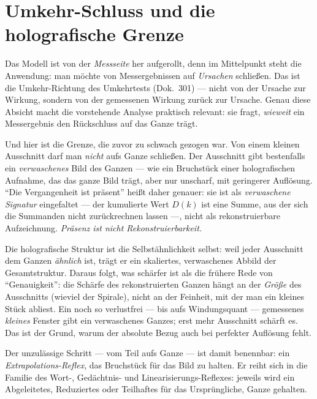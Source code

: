 \section{Umkehr-Schluss und die holografische Grenze}

Das Modell ist von der \emph{Messseite} her aufgerollt, denn im Mittelpunkt steht die
Anwendung: man möchte von Messergebnissen auf \emph{Ursachen} schließen. Das ist die
Umkehr-Richtung des Umkehrtests (Dok.~301) --- nicht von der Ursache zur Wirkung, sondern von
der gemessenen Wirkung zurück zur Ursache. Genau diese Absicht macht die vorstehende Analyse
praktisch relevant: sie fragt, \emph{wieweit} ein Messergebnis den Rückschluss auf das Ganze
trägt.

Und hier ist die Grenze, die zuvor zu schwach gezogen war. Von einem kleinen Ausschnitt darf
man \emph{nicht} aufs Ganze schließen. Der Ausschnitt gibt bestenfalls ein \emph{verwaschenes}
Bild des Ganzen --- wie ein Bruchstück einer holografischen Aufnahme, das das ganze Bild
trägt, aber nur unscharf, mit geringerer Auflösung. \enquote{Die Vergangenheit ist präsent}
heißt daher genauer: sie ist als \emph{verwaschene Signatur} eingefaltet --- der kumulierte
Wert $D(k)$ ist eine Summe, aus der sich die Summanden nicht zurückrechnen lassen ---, nicht
als rekonstruierbare Aufzeichnung. \emph{Präsenz ist nicht Rekonstruierbarkeit.}

Die holografische Struktur ist die Selbstähnlichkeit selbst: weil jeder Ausschnitt dem Ganzen
\emph{ähnlich} ist, trägt er ein skaliertes, verwaschenes Abbild der Gesamtstruktur. Daraus
folgt, was schärfer ist als die frühere Rede von \enquote{Genauigkeit}: die Schärfe des
rekonstruierten Ganzen hängt an der \emph{Größe} des Ausschnitts (wieviel der Spirale), nicht
an der Feinheit, mit der man ein kleines Stück abliest. Ein noch so verlustfrei --- bis aufs
Windungsquant --- gemessenes \emph{kleines} Fenster gibt ein verwaschenes Ganzes; erst mehr
Ausschnitt schärft es. Das ist der Grund, warum der absolute Bezug auch bei perfekter
Auflösung fehlt.

Der unzulässige Schritt --- vom Teil aufs Ganze --- ist damit benennbar: ein
\emph{Extrapolations-Reflex}, das Bruchstück für das Bild zu halten. Er reiht sich in die
Familie des Wort-, Gedächtnis- und Linearisierungs-Reflexes: jeweils wird ein Abgeleitetes,
Reduziertes oder Teilhaftes für das Ursprüngliche, Ganze gehalten.

